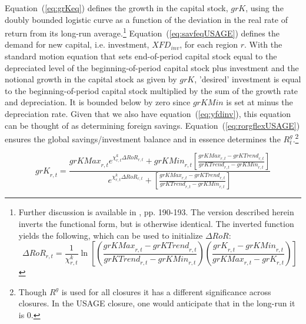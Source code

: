 \documentclass[11pt,letterpaper]{report}
\begin{document}
Equation~(\ref{eq:grKeq}) defines the growth in the capital stock,
$\mathit{grK}$, using the doubly bounded logistic curve as a function of the
deviation in the real rate of return from its long-run
average.\footnote{Further discussion is available in \cite{DixonRimmer2002},
pp. 190-193. The version described herein inverts the functional form, but is
otherwise identical. The inverted function yields the following, which can be
used to initialize $\mathit{\Delta{\mathit{RoR}}}$:
\[
\mathit{\Delta{\mathit{RoR}}_{r,t}} =
   \frac{1}{\chi^k_{r,t}} \ln \left[ \left(
      \frac {\mathit{grKMax}_{r,t}-\mathit{grKTrend}_{r,t}}
         {\mathit{grKTrend}_{r,t}-\mathit{grKMin}_{r,t}}
      \right)
      \left(\frac {\mathit{grK}_{r,t}-\mathit{grKMin}_{r,t}}
         {\mathit{grKMax}_{r,t}-\mathit{grK}_{r,t}}
      \right)
   \right]
\]
} Equation~(\ref{eq:savfeqUSAGE}) defines the demand for new capital, i.e.
investment, $\mathit{XFD}_{\mathit{inv}}$, for each region $r$. With the
standard motion equation that sets end-of-period capital stock equal to the
depreciated level of the beginning-of-period capital stock plus investment and
the notional growth in the capital stock as given by $\mathit{grK}$, 'desired'
investment is equal to the beginning-of-period capital stock multiplied by the
sum of the growth rate and depreciation. It is bounded below by zero since
$\mathit{grKMin}$ is set at minus the depreciation rate. Given that we also have
equation~(\ref{eq:yfdinv}), this equation can be thought of as determining
foreign savings. Equation~(\ref{eq:rorgflexUSAGE}) ensures the global
savings/investment balance and in essence determines the
$\mathit{R}_{t}^g$.\footnote{Though $R^g$ is used for all closures it has a
different significance across closures. In the USAGE closure, one would
anticipate that in the long-run it is 0.}

\begin{equation}
\label{eq:grKeq}
\mathit{grK}_{r,t} =
   \frac {\mathit{grKMax}_{r,t} e^{\chi^k_{r,t}
      {\mathit{\Delta{\mathit{RoR}}_{r,t}}}}
         + \mathit{grKMin}_{r,t} \left[
            \displaystyle \frac {\mathit{grKMax}_{r,t}-\mathit{grKTrend}_{r,t}}
            {\mathit{grKTrend}_{r,t}-\mathit{grKMin}_{r,t}}
           \right]}
            {e^{\chi^k_{r,t} {\mathit{\Delta{\mathit{RoR}}_{r,t}}}}
   + \left[ \displaystyle \frac
         {\mathit{grKMax}_{r,t}-\mathit{grKTrend}_{r,t}}
         {\mathit{grKTrend}_{r,t}-\mathit{grKMin}_{r,t}}
     \right]}
\end{equation}
\end{document}
